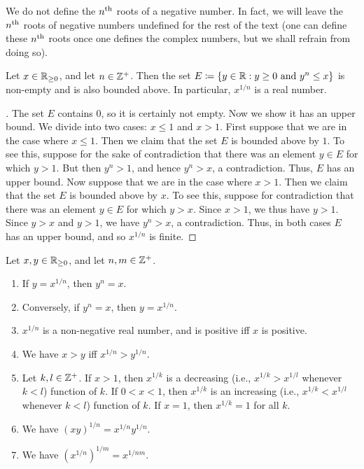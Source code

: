 \begin{note}
  We do not define the \(n^{\operatorname{th}}\) roots of a negative number.
  In fact, we will leave the \(n^{\operatorname{th}}\) roots of negative numbers undefined for the rest of the text
  (one can define these \(n^{\operatorname{th}}\) roots once one defines the complex numbers, but we shall refrain from doing so).
\end{note}

\begin{lem}\label{i:5.6.5}
  Let \(x \in \mathbb{R}_{\geq 0}\), and let \(n \in \mathbb{Z}^+\).
  Then the set \(E \coloneqq \left\lbrace y \in \mathbb{R} : y \geq 0 \text{ and } y^n \leq x\right\rbrace\) is non-empty and is also bounded above.
  In particular, \(x^{1 / n}\) is a real number.
\end{lem}

\begin{proof}[]
  The set \(E\) contains \(0\), so it is certainly not empty.
  Now we show it has an upper bound.
  We divide into two cases: \(x \leq 1\) and \(x > 1\).
  First suppose that we are in the case where \(x \leq 1\).
  Then we claim that the set \(E\) is bounded above by \(1\).
  To see this, suppose for the sake of contradiction that there was an element \(y \in E\) for which \(y > 1\).
  But then \(y^n > 1\), and hence \(y^n > x\), a contradiction.
  Thus, \(E\) has an upper bound.
  Now suppose that we are in the case where \(x > 1\).
  Then we claim that the set \(E\) is bounded above by \(x\).
  To see this, suppose for contradiction that there was an element \(y \in E\) for which \(y > x\).
  Since \(x > 1\), we thus have \(y > 1\).
  Since \(y > x\) and \(y > 1\), we have \(y^n > x\), a contradiction.
  Thus, in both cases \(E\) has an upper bound, and so \(x^{1 / n}\) is finite.
\end{proof}

\begin{lem}\label{i:5.6.6}
  Let \(x, y \in \mathbb{R}_{\geq 0}\), and let \(n, m \in \mathbb{Z}^+\).
  \begin{enumerate}
    \item If \(y = x^{1 / n}\), then \(y^n = x\).
    \item Conversely, if \(y^n = x\), then \(y = x^{1 / n}\).
    \item \(x^{1 / n}\) is a non-negative real number, and is positive iff \(x\) is positive.
    \item We have \(x > y\) iff \(x^{1 / n} > y^{1 / n}\).
    \item Let \(k, l \in \mathbb{Z}^+\).
          If \(x > 1\), then \(x^{1 / k}\) is a decreasing (i.e., \(x^{1 / k} > x^{1 / l}\) whenever \(k < l\)) function of \(k\).
          If \(0 < x < 1\), then \(x^{1 / k}\) is an increasing (i.e., \(x^{1 / k} < x^{1 / l}\) whenever \(k < l\)) function of \(k\).
          If \(x = 1\), then \(x^{1 / k} = 1\) for all \(k\).
    \item We have \((xy)^{1 / n} = x^{1 / n} y^{1 / n}\).
    \item We have \((x^{1 / n})^{1 / m} = x^{1 / nm}\).
  \end{enumerate}
\end{lem}

